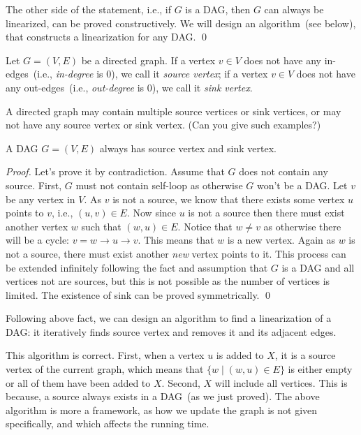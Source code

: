 The other side of the statement, i.e., if $G$ is a DAG, then $G$ can always be linearized, can be proved constructively.
We will design an algorithm~(see below), that constructs a linearization for any DAG. \qed


Let $G = (V, E)$ be a directed graph. 
If a vertex $v\in V$ does not have any in-edges~(i.e., \emph{in-degree} is 0), we call it \emph{source vertex};
if a vertex $v\in V$ does not have any out-edges~(i.e., \emph{out-degree} is 0), we call it \emph{sink vertex}.

A directed graph may contain multiple source vertices or sink vertices,
or may not have any source vertex or sink vertex. (Can you give such examples?)

\begin{claim}
A DAG $G=(V,E)$ always has source vertex and sink vertex.
\end{claim}
\emph{Proof.} Let's prove it by contradiction. Assume that $G$ does not contain any source.
First, $G$ must not contain self-loop as otherwise $G$ won't be a DAG.
Let $v$ be any vertex in $V$. As $v$ is not a source, we know that there exists some vertex $u$ points to $v$, i.e., $(u,v)\in E$.
Now since $u$ is not a source then there must exist another vertex $w$ such that $(w,u)\in E$.
Notice that $w \neq v$ as otherwise there will be a cycle: $v = w \to u \to v$.
This means that $w$ is a new vertex. Again as $w$ is not a source, there must exist another \emph{new} vertex points to it.
This process can be extended infinitely following the fact and assumption that $G$ is a DAG and all vertices not are sources,
but this is not possible as the number of vertices is limited. 
The existence of sink can be proved symmetrically. \qed


Following above fact, we can design an algorithm to find a linearization of a DAG: it iteratively
finds source vertex and removes it and its adjacent edges.

\begin{minipage}{0.8\textwidth}
	\xxx
	\xxx
	\xxx
	\xxx
	\xxx
	\xxx
	\xxx
	\xxx
\end{minipage}

This algorithm is correct. First, when a vertex $u$ is added to $X$,
it is a source vertex of the current graph, which means that
$\{w\mid (w, u)\in E\}$ is either empty or all of them
have been added to $X$. Second, $X$ will include all vertices.
This is because, a source always exists in a DAG~(as we just proved).
The above algorithm is more a framework, as how we update the graph
is not given specifically, and which affects the running time.

